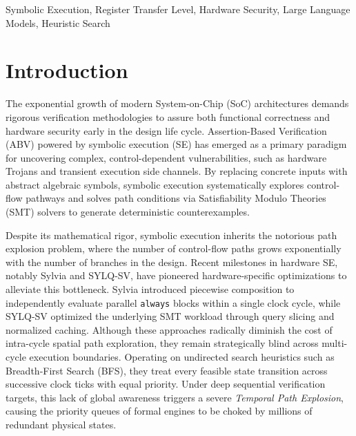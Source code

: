 \documentclass[conference]{IEEEtran}
\begin{document}
\begin{IEEEkeywords}
Symbolic Execution, Register Transfer Level, Hardware Security, Large Language Models, Heuristic Search
\end{IEEEkeywords}

\section{Introduction}
\label{sec:intro}
The exponential growth of modern System-on-Chip (SoC) architectures demands rigorous verification methodologies to assure both functional correctness and hardware security early in the design life cycle. Assertion-Based Verification (ABV) powered by symbolic execution (SE) has emerged as a primary paradigm for uncovering complex, control-dependent vulnerabilities, such as hardware Trojans and transient execution side channels. By replacing concrete inputs with abstract algebraic symbols, symbolic execution systematically explores control-flow pathways and solves path conditions via Satisfiability Modulo Theories (SMT) solvers to generate deterministic counterexamples.

Despite its mathematical rigor, symbolic execution inherits the notorious path explosion problem, where the number of control-flow paths grows exponentially with the number of branches in the design. Recent milestones in hardware SE, notably Sylvia and SYLQ-SV, have pioneered hardware-specific optimizations to alleviate this bottleneck. Sylvia introduced piecewise composition to independently evaluate parallel \texttt{always} blocks within a single clock cycle, while SYLQ-SV optimized the underlying SMT workload through query slicing and normalized caching. Although these approaches radically diminish the cost of intra-cycle spatial path exploration, they remain strategically blind across multi-cycle execution boundaries. Operating on undirected search heuristics such as Breadth-First Search (BFS), they treat every feasible state transition across successive clock ticks with equal priority. Under deep sequential verification targets, this lack of global awareness triggers a severe \textit{Temporal Path Explosion}, causing the priority queues of formal engines to be choked by millions of redundant physical states.
\end{document}
